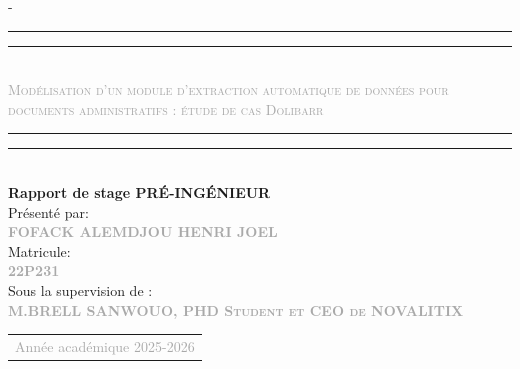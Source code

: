 \begin{titlingpage}
\begin{SingleSpace}
\begin{adjustwidth*}{\unitlength}{-\unitlength}
\begin{center}
\end{center}
\hspace{3cm}
\vspace{2.3cm}
\begin{center}
\rule[0.5ex]{\linewidth}{2pt}\vspace*{-\baselineskip}\vspace*{3.2pt}
\rule[0.5ex]{\linewidth}{1pt}\\[\baselineskip]
{\LARGE \textcolor{darkgray}{\textsc{Modélisation d'un module d'extraction automatique de données pour documents administratifs : étude de cas Dolibarr}}}\\[4mm]

\rule[0.5ex]{\linewidth}{1pt}\vspace*{-\baselineskip}\vspace{3.2pt}
\rule[0.5ex]{\linewidth}{2pt}\\
\vspace{10mm}
{\Large \textbf{Rapport de stage PR\'E-ING\'ENIEUR}}\\
\vspace{15mm}
{\Large Pr\'esent\'e par: } \\
\vspace{4mm}
{\large \textsc{\textbf{\textcolor{darkgray}{FOFACK ALEMDJOU HENRI JOEL}}}}\\
\vspace{15mm}
{\Large Matricule: } \\
\vspace{4mm}
{\large \textsc{\textbf{\textcolor{darkgray}{22P231}}}}\\
\vspace{3.5mm}
\vspace{20mm}
{\Large Sous la supervision de :}\\
\vspace{4mm}
{\normalsize \textsc{\textbf{\textcolor{darkgray}{M.BRELL SANWOUO, PHD Student et CEO de NOVALITIX}}}}\\
\vspace{4.5mm}
\vspace{15mm}


\begin{tabular}{c}
{\Large \textcolor{darkgray}{Ann\'ee acad\'emique 2025-2026}}\\
\end{tabular}


\end{center}
\end{adjustwidth*}
\end{SingleSpace}
\end{titlingpage}
